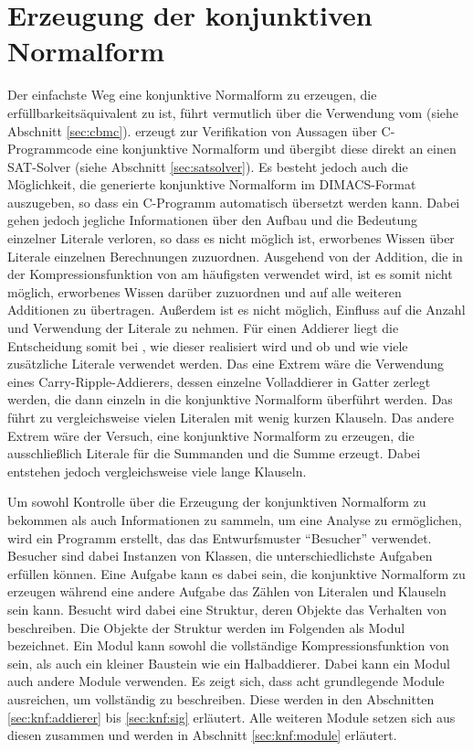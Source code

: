 \chapter{Erzeugung der konjunktiven Normalform}
\label{chp:knf}

Der einfachste Weg eine konjunktive Normalform zu erzeugen, die erfüllbarkeitsäquivalent zu  ist, führt vermutlich über die Verwendung vom 
(siehe Abschnitt \ref{sec:cbmc}).  erzeugt zur Verifikation von Aussagen über C-Programmcode eine konjunktive Normalform und übergibt diese direkt
an einen SAT-Solver (siehe Abschnitt \ref{sec:satsolver}). Es besteht jedoch auch die Möglichkeit, die generierte konjunktive Normalform im DIMACS-Format auszugeben,
so dass ein C-Programm automatisch übersetzt werden kann. Dabei gehen jedoch jegliche Informationen über den Aufbau und die Bedeutung einzelner Literale verloren,
so dass es nicht möglich ist, erworbenes Wissen über Literale einzelnen Berechnungen zuzuordnen. Ausgehend von der Addition, die in der Kompressionsfunktion von
 am häufigsten verwendet wird, ist es somit nicht möglich, erworbenes Wissen darüber zuzuordnen und auf alle weiteren Additionen zu übertragen.
Außerdem ist es nicht möglich, Einfluss auf die Anzahl und Verwendung der Literale zu nehmen. Für einen Addierer liegt die Entscheidung somit bei ,
wie dieser realisiert wird und ob und wie viele zusätzliche Literale verwendet werden. Das eine Extrem wäre die Verwendung eines Carry-Ripple-Addierers, dessen einzelne
Volladdierer in Gatter zerlegt werden, die dann einzeln in die konjunktive Normalform überführt werden. Das führt zu vergleichsweise vielen Literalen mit wenig
kurzen Klauseln. Das andere Extrem wäre der Versuch, eine konjunktive Normalform zu erzeugen, die ausschließlich Literale für die Summanden und die Summe erzeugt.
Dabei entstehen jedoch vergleichsweise viele lange Klauseln.

Um sowohl Kontrolle über die Erzeugung der konjunktiven Normalform zu bekommen als auch Informationen zu sammeln, um eine Analyse zu ermöglichen, wird ein Programm
erstellt, das das Entwurfsmuster "`Besucher"' \cite[301]{visitor} verwendet. Besucher sind dabei Instanzen von Klassen, die unterschiedlichste Aufgaben erfüllen können.
Eine Aufgabe kann es dabei sein, die konjunktive Normalform zu erzeugen während eine andere Aufgabe das Zählen von Literalen und Klauseln sein kann.
Besucht wird dabei eine Struktur, deren Objekte das Verhalten von  beschreiben. Die Objekte der Struktur werden im Folgenden als Modul bezeichnet.
Ein Modul kann sowohl die vollständige Kompressionsfunktion von  sein, als auch ein kleiner Baustein wie ein Halbaddierer. Dabei kann ein Modul
auch andere Module verwenden. Es zeigt sich, dass acht grundlegende Module ausreichen, um  vollständig zu beschreiben. Diese werden in den Abschnitten
\ref{sec:knf:addierer} bis \ref{sec:knf:sig} erläutert. Alle weiteren Module setzen sich aus diesen zusammen und werden in Abschnitt \ref{sec:knf:module} erläutert.

